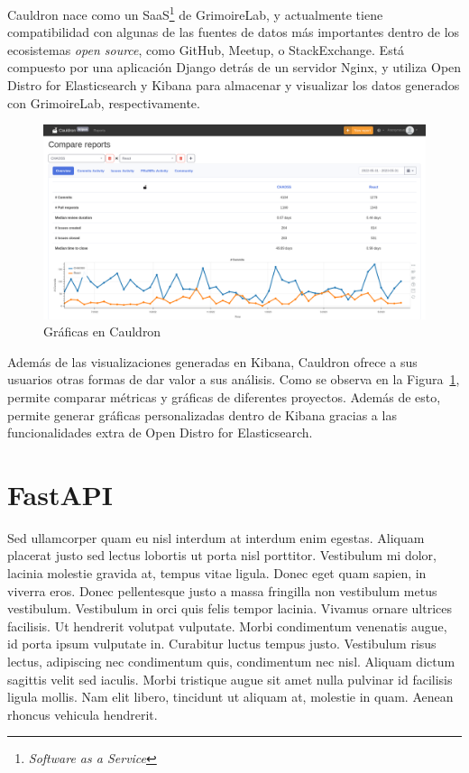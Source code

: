 Cauldron nace como un SaaS\footnote{\emph{Software as a Service}} de GrimoireLab, y actualmente tiene compatibilidad con algunas de las fuentes de datos más importantes dentro de los ecosistemas \emph{open source}, como GitHub, Meetup, o StackExchange. Está compuesto por una aplicación Django detrás de un servidor Nginx, y utiliza Open Distro for Elasticsearch y Kibana para almacenar y visualizar los datos generados con GrimoireLab, respectivamente.

\begin{figure}[ht]
    \centering
    \includegraphics[width=\textwidth]{Figures/cauldron-charts}
    \decoRule
    \caption[Cauldron (Gráficas)]{Gráficas en Cauldron \emph{\parencite{Reference13}}}
    \label{fig:cauldron-charts}
\end{figure}

Además de las visualizaciones generadas en Kibana, Cauldron ofrece a sus usuarios otras formas de dar valor a sus análisis. Como se observa en la Figura~\ref{fig:cauldron-charts}, permite comparar métricas y gráficas de diferentes proyectos. Además de esto, permite generar gráficas personalizadas dentro de Kibana gracias a las funcionalidades extra de Open Distro for Elasticsearch.


\section{FastAPI}

Sed ullamcorper quam eu nisl interdum at interdum enim egestas. Aliquam placerat justo sed lectus lobortis ut porta nisl porttitor. Vestibulum mi dolor, lacinia molestie gravida at, tempus vitae ligula. Donec eget quam sapien, in viverra eros. Donec pellentesque justo a massa fringilla non vestibulum metus vestibulum. Vestibulum in orci quis felis tempor lacinia. Vivamus ornare ultrices facilisis. Ut hendrerit volutpat vulputate. Morbi condimentum venenatis augue, id porta ipsum vulputate in. Curabitur luctus tempus justo. Vestibulum risus lectus, adipiscing nec condimentum quis, condimentum nec nisl. Aliquam dictum sagittis velit sed iaculis. Morbi tristique augue sit amet nulla pulvinar id facilisis ligula mollis. Nam elit libero, tincidunt ut aliquam at, molestie in quam. Aenean rhoncus vehicula hendrerit.

